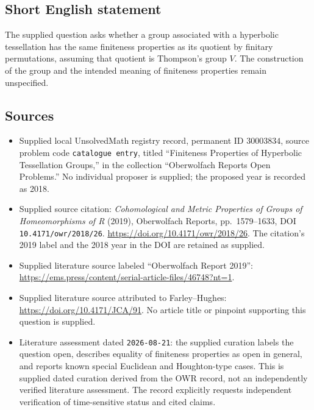 \documentclass[11pt]{article}
\begin{document}
\subsection{Short English statement}
The supplied question asks whether a group associated with a hyperbolic tessellation has the same finiteness properties as its quotient by finitary permutations, assuming that quotient is Thompson's group \(V\). The construction of the group and the intended meaning of finiteness properties remain unspecified.
\subsection{Sources}
\begin{itemize}
\item Supplied local UnsolvedMath registry record, permanent ID \(30003834\), source problem code \texttt{catalogue entry}, titled ``Finiteness Properties of Hyperbolic Tessellation Groups,'' in the collection ``Oberwolfach Reports Open Problems.'' No individual proposer is supplied; the proposed year is recorded as 2018.
\item Supplied source citation: \emph{Cohomological and Metric Properties of Groups of Homeomorphisms of R} (2019), Oberwolfach Reports, pp.\ 1579--1633, DOI \texttt{10.4171/owr/2018/26}. \url{https://doi.org/10.4171/owr/2018/26}. The citation's 2019 label and the 2018 year in the DOI are retained as supplied.
\item Supplied literature source labeled ``Oberwolfach Report 2019'': \url{https://ems.press/content/serial-article-files/46748?nt=1}.
\item Supplied literature source attributed to Farley--Hughes: \url{https://doi.org/10.4171/JCA/91}. No article title or pinpoint supporting this question is supplied.
\item Literature assessment dated \texttt{2026-08-21}: the supplied curation labels the question open, describes equality of finiteness properties as open in general, and reports known special Euclidean and Houghton-type cases. This is supplied dated curation derived from the OWR record, not an independently verified literature assessment. The record explicitly requests independent verification of time-sensitive status and cited claims.
\end{itemize}
\end{document}
